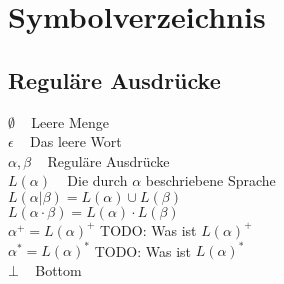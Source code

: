 \chapter*{Symbolverzeichnis}
\section*{Reguläre Ausdrücke}
$\emptyset\;\;\;$ Leere Menge\\
$\epsilon\;\;\;$ Das leere Wort\\
$\alpha, \beta\;\;\;$ Reguläre Ausdrücke\\
$L(\alpha)\;\;\;$ Die durch $\alpha$ beschriebene Sprache\\
$L(\alpha | \beta) = L(\alpha) \cup L(\beta)$\\
$L(\alpha \cdot \beta) = L(\alpha) \cdot L(\beta)$\\
$\alpha^+ = L(\alpha)^+$ TODO: Was ist $L(\alpha)^+$\\
$\alpha^* = L(\alpha)^*$ TODO: Was ist $L(\alpha)^*$\\
$\bot\;\;\;$ Bottom\\